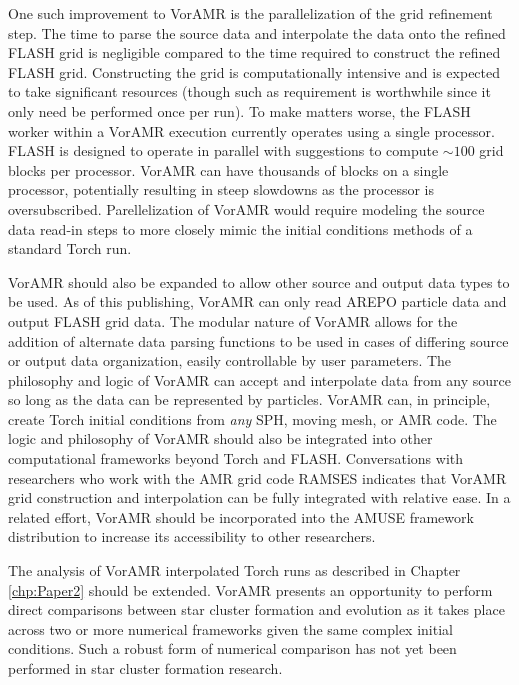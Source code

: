 \documentclass[twoside]{drexel-thesis}
\begin{document}
\begin{thesis}
One such improvement to VorAMR is the parallelization of the grid refinement step. The time to parse the source data and interpolate the data onto the refined FLASH grid is negligible compared to the time required to construct the refined FLASH grid. Constructing the grid is computationally intensive and is expected to take significant resources (though such as requirement is worthwhile since it only need be performed once per run). To make matters worse, the FLASH worker within a VorAMR execution currently operates using a single processor. FLASH is designed to operate in parallel with suggestions to compute $\sim100$ grid blocks per processor. VorAMR can have thousands of blocks on a single processor, potentially resulting in steep slowdowns as the processor is oversubscribed. Parellelization of VorAMR would require modeling the source data read-in steps to more closely mimic the initial conditions methods of a standard Torch run. 

VorAMR should also be expanded to allow other source and output data types to be used. As of this publishing, VorAMR can only read AREPO particle data and output FLASH grid data. The modular nature of VorAMR allows for the addition of alternate data parsing functions to be used in cases of differing source or output data organization, easily controllable by user parameters. The philosophy and logic of VorAMR can accept and interpolate data from any source so long as the data can be represented by particles. VorAMR can, in principle, create Torch initial conditions from \emph{any} SPH, moving mesh, or AMR code. The logic and philosophy of VorAMR should also be integrated into other computational frameworks beyond Torch and FLASH. Conversations with researchers who work with the AMR grid code RAMSES \citep{teyssier_cosmological_2002} indicates that VorAMR grid construction and interpolation can be fully integrated with relative ease. In a related effort, VorAMR should be incorporated into the AMUSE framework distribution to increase its accessibility to other researchers.

The analysis of VorAMR interpolated Torch runs as described in Chapter \ref{chp:Paper2} should be extended. VorAMR presents an opportunity to perform direct comparisons between star cluster formation and evolution as it takes place across two or more numerical frameworks given the same complex initial conditions. Such a robust form of numerical comparison has not yet been performed in star cluster formation research. 




\end{thesis}
\end{document}
